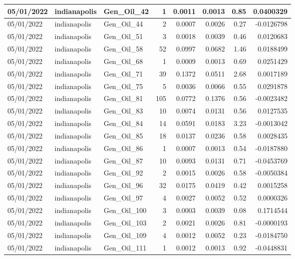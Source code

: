 \documentclass[
  letterpaper,
  DIV=11,
  numbers=noendperiod]{scrartcl}
\begin{document}
\begin{tabular}{l|l|l|r|r|r|r|r}
\hline
05/01/2022 & indianapolis & Gen\_Oil\_42 & 1 & 0.0011 & 0.0013 & 0.85 & 0.0400329\\
\hline
05/01/2022 & indianapolis & Gen\_Oil\_44 & 2 & 0.0007 & 0.0026 & 0.27 & -0.0126798\\
\hline
05/01/2022 & indianapolis & Gen\_Oil\_51 & 3 & 0.0018 & 0.0039 & 0.46 & 0.0120683\\
\hline
05/01/2022 & indianapolis & Gen\_Oil\_58 & 52 & 0.0997 & 0.0682 & 1.46 & 0.0188499\\
\hline
05/01/2022 & indianapolis & Gen\_Oil\_68 & 1 & 0.0009 & 0.0013 & 0.69 & 0.0251429\\
\hline
05/01/2022 & indianapolis & Gen\_Oil\_71 & 39 & 0.1372 & 0.0511 & 2.68 & 0.0017189\\
\hline
05/01/2022 & indianapolis & Gen\_Oil\_75 & 5 & 0.0036 & 0.0066 & 0.55 & 0.0291878\\
\hline
05/01/2022 & indianapolis & Gen\_Oil\_81 & 105 & 0.0772 & 0.1376 & 0.56 & -0.0023482\\
\hline
05/01/2022 & indianapolis & Gen\_Oil\_83 & 10 & 0.0074 & 0.0131 & 0.56 & 0.0127535\\
\hline
05/01/2022 & indianapolis & Gen\_Oil\_84 & 14 & 0.0591 & 0.0183 & 3.23 & -0.0013042\\
\hline
05/01/2022 & indianapolis & Gen\_Oil\_85 & 18 & 0.0137 & 0.0236 & 0.58 & 0.0028435\\
\hline
05/01/2022 & indianapolis & Gen\_Oil\_86 & 1 & 0.0007 & 0.0013 & 0.54 & -0.0187880\\
\hline
05/01/2022 & indianapolis & Gen\_Oil\_87 & 10 & 0.0093 & 0.0131 & 0.71 & -0.0453769\\
\hline
05/01/2022 & indianapolis & Gen\_Oil\_92 & 2 & 0.0015 & 0.0026 & 0.58 & -0.0050384\\
\hline
05/01/2022 & indianapolis & Gen\_Oil\_96 & 32 & 0.0175 & 0.0419 & 0.42 & 0.0015258\\
\hline
05/01/2022 & indianapolis & Gen\_Oil\_97 & 4 & 0.0027 & 0.0052 & 0.52 & 0.0000326\\
\hline
05/01/2022 & indianapolis & Gen\_Oil\_100 & 3 & 0.0003 & 0.0039 & 0.08 & 0.1714544\\
\hline
05/01/2022 & indianapolis & Gen\_Oil\_103 & 2 & 0.0021 & 0.0026 & 0.81 & -0.0000193\\
\hline
05/01/2022 & indianapolis & Gen\_Oil\_109 & 4 & 0.0012 & 0.0052 & 0.23 & -0.0184750\\
\hline
05/01/2022 & indianapolis & Gen\_Oil\_111 & 1 & 0.0012 & 0.0013 & 0.92 & -0.0448831\\

\end{tabular}
\end{document}
